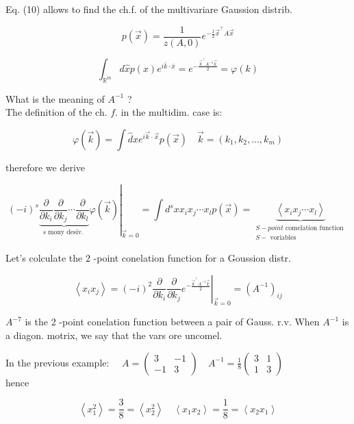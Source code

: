 \documentclass[10pt]{article}
\begin{document}
Eq. (10) allows to find the ch.f. of the multivariare Gaussion distrib.

$$
p(\vec{x})=\frac{1}{z(A, 0)} e^{-\frac{1}{2} \vec{x}^{\top} A \vec{x}}
$$

$$
\int_{\mathbb{R}^{m}} d \hat{x} p(x) e^{i \bar{k} \cdot \bar{x}}=e^{-\frac{\vec{k}^{\top} A^{-1} \vec{k}}{2}}=\varphi(k)
$$

What is the meaning of $A^{-1}$ ?\\
The definition of the ch. $f$. in the multidim. case is:

$$
\varphi(\vec{k})=\int \hat{d} x e^{i \vec{k} \cdot \vec{x}} p(\vec{x}) \quad \vec{k}=\left(k_{1}, k_{2}, \ldots, k_{m}\right)
$$

therefore we derive


\begin{equation*}
\left.(-i)^{s} \underbrace{\frac{\partial}{\partial k_{i}} \frac{\partial}{\partial k_{j}} \cdots \frac{\partial}{\partial k_{l}}}_{s \text { mony desiv. }} \varphi(\vec{k})\right|_{\vec{k}=0}=\int d^{s} x x_{i} x_{j} \cdots x_{l} p(\vec{x})=\underbrace{\left\langle x_{i} x_{j} \cdots x_{l}\right\rangle}_{\substack{S-p o i n t \text { comelation function } \\ S-\text { voriables }}} \tag{12}
\end{equation*}


Let's colculate the 2 -point conelation function for a Goussion distr.


\begin{equation*}
\left\langle x_{i} x_{j}\right\rangle=\left.(-i)^{2} \frac{\partial}{\partial k_{i}} \frac{\partial}{\partial k_{j}} e^{-\frac{\vec{k}^{\top} A^{-1} \vec{k}}{2}}\right|_{\vec{k}=0}=\left(A^{-1}\right)_{i j} \tag{13}
\end{equation*}


$A^{-7}$ is the 2 -point conelation function between a pair of Gauss. r.v. When $A^{-1}$ is a diagon. motrix, we say that the vars ore uncomel.

In the previous example: $\quad A=\left(\begin{array}{cc}3 & -1 \\ -1 & 3\end{array}\right) \quad A^{-1}=\frac{1}{8}\left(\begin{array}{ll}3 & 1 \\ 1 & 3\end{array}\right)$\\
hence

$$
\left\langle x_{1}^{2}\right\rangle=\frac{3}{8}=\left\langle x_{2}^{2}\right\rangle \quad\left\langle x_{1} x_{2}\right\rangle=\frac{1}{8}=\left\langle x_{2} x_{1}\right\rangle
$$
\end{document}
